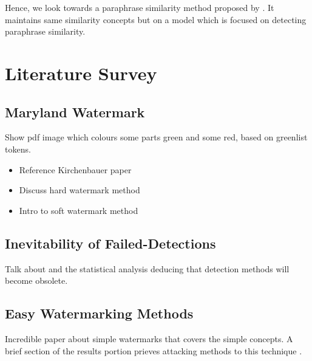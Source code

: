 \documentclass{l4proj}
\theoremstyle{definition}
\begin{document}

        Hence, we look towards a paraphrase similarity method proposed by \citet{wieting2023paraphrastic}. It maintains same similarity concepts but on a model which is focused on detecting paraphrase similarity.

\section{Literature Survey}
    \subsection{Maryland Watermark}
        Show pdf image which colours some parts green and some red, based on greenlist tokens.
        \begin{itemize}
            \setlength\itemsep{0.5em}
            \item Reference Kirchenbauer paper
            \item Discuss hard watermark method 
            \item Intro to soft watermark method
        \end{itemize}
    \subsection{Inevitability of Failed-Detections} %
        Talk about \citet{sadasivan2023aigenerated} and the statistical analysis deducing that detection methods will become obsolete.
    \subsection{Easy Watermarking Methods}
        Incredible paper about simple watermarks that covers the simple concepts. A brief section of the results portion prieves attacking methods to this technique \citep{sato2023embarrassingly}.
\end{document}

